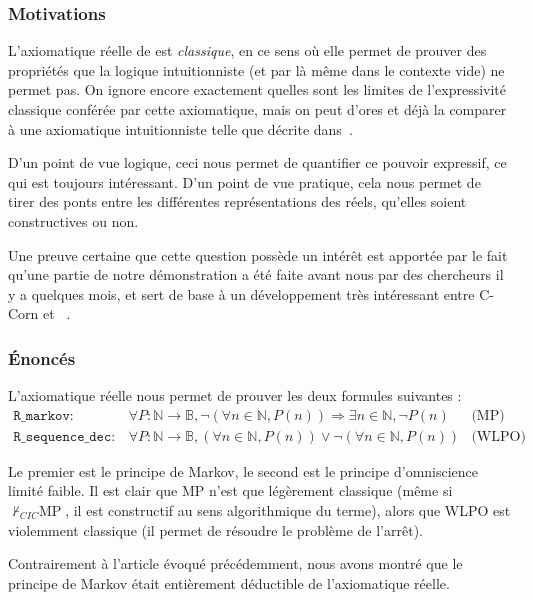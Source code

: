 \subsubsection{Motivations}

L'axiomatique réelle de \Coq{} est \emph{classique}, en ce sens où elle permet de prouver des propriétés que la logique intuitionniste (et par là même \Coq{} dans le contexte vide) ne permet pas. On ignore encore exactement quelles sont les limites de l'expressivité classique conférée par cette axiomatique, mais on peut d'ores et déjà la comparer à une axiomatique intuitionniste telle que décrite dans~\cite{Ciaffaglione00}.

D'un point de vue logique, ceci nous permet de quantifier ce pouvoir expressif, ce qui est toujours intéressant. D'un point de vue pratique, cela nous permet de tirer des ponts entre les différentes représen\-tations des réels, qu'elles soient constructives ou non.

Une preuve certaine que cette question possède un intérêt est apportée par le fait qu'une partie de notre démonstration a été faite avant nous par des chercheurs il y a quelques mois, et sert de base à un développement très intéressant entre C-Corn et \Coq{}~\cite{DBLP08}.

\subsubsection{Énoncés}

L'axiomatique réelle nous permet de prouver les deux formules suivantes :
$$\begin{array}{llc}
\mathtt{R\_markov} :& \forall P : \mathbb{N}\rightarrow\mathbb{B}, \neg(\forall n\in\mathbb{N}, P(n)) \Rightarrow \exists n\in\mathbb{N}, \neg P(n) & \text{(MP)}\\
\mathtt{R\_sequence\_dec} :& \forall P : \mathbb{N}\rightarrow\mathbb{B}, (\forall n\in\mathbb{N}, P(n)) \vee \neg(\forall n\in\mathbb{N}, P(n)) & \text{(WLPO)}
\end{array}$$

Le premier est le principe de Markov, le second est le principe d'omniscience limité faible. Il est clair que MP n'est que légèrement classique (même si $\not\vdash_{CIC}\text{MP}$, il est constructif au sens algorithmique du terme), alors que WLPO est violemment classique (il permet de résoudre le problème de l'arrêt).

Contrairement à l'article évoqué précédemment, nous avons montré que le principe de Markov était entièrement déductible de l'axiomatique réelle.

